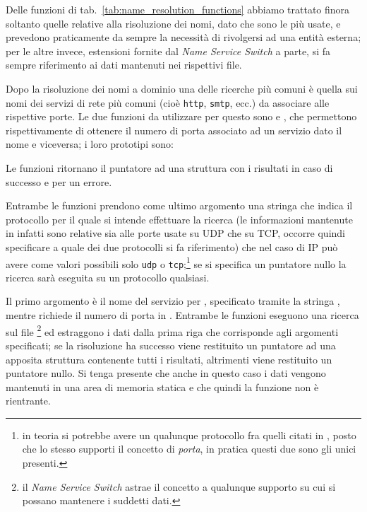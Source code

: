 Delle funzioni di tab.~\ref{tab:name_resolution_functions} abbiamo trattato
finora soltanto quelle relative alla risoluzione dei nomi, dato che sono le
più usate, e prevedono praticamente da sempre la necessità di rivolgersi ad
una entità esterna; per le altre invece, estensioni fornite dal \textit{Name
  Service Switch} a parte, si fa sempre riferimento ai dati mantenuti nei
rispettivi file.

Dopo la risoluzione dei nomi a dominio una delle ricerche più comuni è quella
sui nomi dei servizi di rete più comuni (cioè \texttt{http}, \texttt{smtp},
ecc.) da associare alle rispettive porte. Le due funzioni da utilizzare per
questo sono  e , che permettono
rispettivamente di ottenere il numero di porta associato ad un servizio dato
il nome e viceversa; i loro prototipi sono:



\begin{funcproto}{
}

{Le funzioni ritornano il puntatore ad una struttura  con i
    risultati in caso di successo e  per un errore.}
\end{funcproto}

Entrambe le funzioni prendono come ultimo argomento una stringa 
che indica il protocollo per il quale si intende effettuare la ricerca (le
informazioni mantenute in  infatti sono relative sia
alle porte usate su UDP che su TCP, occorre quindi specificare a quale dei due
protocolli si fa riferimento) che nel caso di IP può avere come valori
possibili solo \texttt{udp} o \texttt{tcp};\footnote{in teoria si potrebbe
  avere un qualunque protocollo fra quelli citati in
  , posto che lo stesso supporti il concetto di
  \textsl{porta}, in pratica questi due sono gli unici presenti.}  se si
specifica un puntatore nullo la ricerca sarà eseguita su un protocollo
qualsiasi.

Il primo argomento è il nome del servizio per ,
specificato tramite la stringa , mentre 
richiede il numero di porta in . Entrambe le funzioni eseguono una
ricerca sul file \footnote{il \textit{Name Service
    Switch} astrae il concetto a qualunque supporto su cui si possano
  mantenere i suddetti dati.}  ed estraggono i dati dalla prima riga che
corrisponde agli argomenti specificati; se la risoluzione ha successo viene
restituito un puntatore ad una apposita struttura  contenente
tutti i risultati, altrimenti viene restituito un puntatore nullo.  Si tenga
presente che anche in questo caso i dati vengono mantenuti in una area di
memoria statica e che quindi la funzione non è rientrante.

